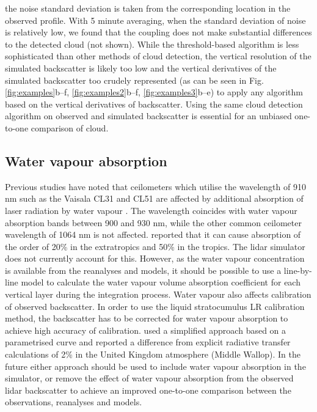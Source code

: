 the noise standard deviation is taken from the corresponding location in the 
observed profile. With 5 minute averaging, when the standard deviation of noise
is relatively low, we found that the coupling does not make substantial
differences to the detected cloud (not shown). While the threshold-based algorithm is
less sophisticated than other methods of cloud detection, the vertical
resolution of the simulated backscatter is likely too low and the vertical
derivatives of the simulated backscatter too crudely represented (as can be seen in Fig. \ref{fig:examples}b--f, \ref{fig:examples2}b--f, \ref{fig:examples3}b--e) to apply any algorithm
based on the vertical derivatives of backscatter. Using the same cloud detection
algorithm on observed and simulated backscatter is essential for an unbiased
one-to-one comparison of cloud.

\subsection{Water vapour absorption}
\label{sec:water-vapour-absorption}

Previous studies have noted that ceilometers which utilise the wavelength
of 910 nm such as the Vaisala CL31 and CL51 are affected by additional
absorption of laser radiation by water vapour \citep{wiegner2015,wiegner2019,hopkin2019}.
The wavelength coincides with water vapour absorption bands between 900 and 930
nm, while the other common ceilometer wavelength of 1064 nm is not affected.
\cite{wiegner2015} reported that it can cause absorption of the order of 20\% in
the extratropics and 50\% in the tropics. The lidar simulator does not currently
account for this. However, as the water vapour concentration is available
from the reanalyses and models, it should be possible to use a line-by-line
model to calculate the water vapour volume absorption coefficient for each
vertical layer during the integration process. Water vapour also affects
calibration of observed backscatter. In order to use the liquid stratocumulus
LR calibration method, the backscatter has to be corrected for 
water vapour absorption to achieve high accuracy of calibration.
\cite{hopkin2019} used a simplified approach based on a parametrised curve
and reported a difference from explicit radiative transfer calculations 
of 2\% in the United Kingdom atmosphere (Middle Wallop). In the future either approach
should be used to include water vapour absorption in the simulator, or
remove the effect of water vapour absorption from the observed lidar backscatter
to achieve an improved one-to-one comparison between the observations,
reanalyses and models.

